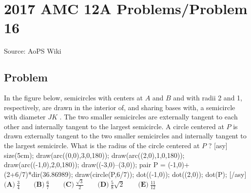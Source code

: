 \documentclass[12pt]{article}
\begin{document}
\section*{{2017 AMC 12A Problems/Problem 16}}
Source: AoPS Wiki

\subsection*{Problem}
In the figure below, semicircles with centers at $A$ and $B$ and with radii 2 and 1, respectively, are drawn in the interior of, and sharing bases with, a semicircle with diameter $JK$ . The two smaller semicircles are externally tangent to each other and internally tangent to the largest semicircle. A circle centered at $P$ is drawn externally tangent to the two smaller semicircles and internally tangent to the largest semicircle. What is the radius of the circle centered at $P$ ? [asy] size(5cm); draw(arc((0,0),3,0,180)); draw(arc((2,0),1,0,180)); draw(arc((-1,0),2,0,180)); draw((-3,0)--(3,0)); pair P = (-1,0)+(2+6/7)*dir(36.86989); draw(circle(P,6/7)); dot((-1,0)); dot((2,0)); dot(P); [/asy] $\textbf{(A)}\ \frac{3}{4} \qquad \textbf{(B)}\ \frac{6}{7} \qquad\textbf{(C)}\ \frac{\sqrt{3}}{2} \qquad\textbf{(D)}\ \frac{5}{8}\sqrt{2} \qquad\textbf{(E)}\ \frac{11}{12}$
\end{document}
